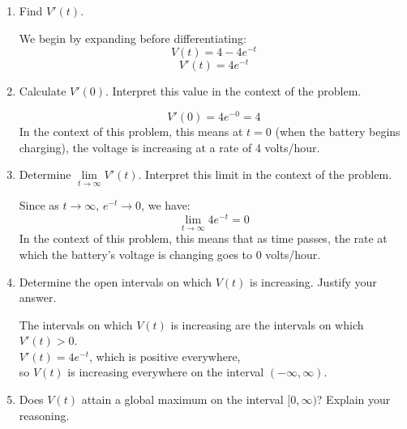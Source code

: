 \documentclass{article}
\theoremstyle{theorem}
\begin{document}
\begin{enumerate}
\begin{enumerate}
\begin{solution}
As $t\to\infty$, $e^{-t}\to 0$, so $\displaystyle \lim_{t\to\infty}V(t) = 4$. In the context of the problem, this means that as time continues passing, the battery's voltage approaches 4 volts.
\end{solution}

    \item 
    \begin{problem}[\vfill] Find $V'(t)$.
    \end{problem}
\begin{solution}
    We begin by expanding before differentiating:
        $$V(t) = 4-4e^{-t}$$
        $$V'(t) = 4e^{-t}$$
    \end{solution}
    \item 
    \begin{problem}[\vfill] Calculate $V'(0)$. Interpret this value in the context of the problem.
    \end{problem}
    \begin{solution}
        $$V'(0)=4e^{-0}=4$$
        In the context of this problem, this means at $t=0$ (when the battery begins charging), the voltage is increasing at a rate of 4 volts/hour.
    \end{solution}
    
\begin{problemonly}
\newpage
\end{problemonly}
    \item 
    \begin{problem}[\vfill]
    Determine $\lim\limits_{t\to\infty} V'(t)$. Interpret this limit in the context of the problem.\\
    \end{problem}
\begin{solution}
    Since as $t\to\infty$, $e^{-t}\to 0$, we have:
    $$\lim_{t\to\infty} 4e^{-t}=0$$
    In the context of this problem, this means that as time passes, the rate at which the battery's voltage is changing goes to 0 volts/hour.
\end{solution}
    \item 
    \begin{problem}[\vfill]
    Determine the open intervals on which $V(t)$ is increasing. Justify your answer.\\
    \end{problem}
\begin{solution}
    The intervals on which $V(t)$ is increasing are the intervals on which $V'(t)>0$. \\
    $V'(t) = 4e^{-t}$, which is positive everywhere, \\
    so $V(t)$ is increasing everywhere on the interval $(-\infty, \infty)$.
\end{solution}
    \item 
    \begin{problem}[\vfill] Does $V(t)$ attain a global maximum on the interval $[0, \infty)$? Explain your reasoning.
    \end{problem}


\end{enumerate}
\end{enumerate}
\end{document}

